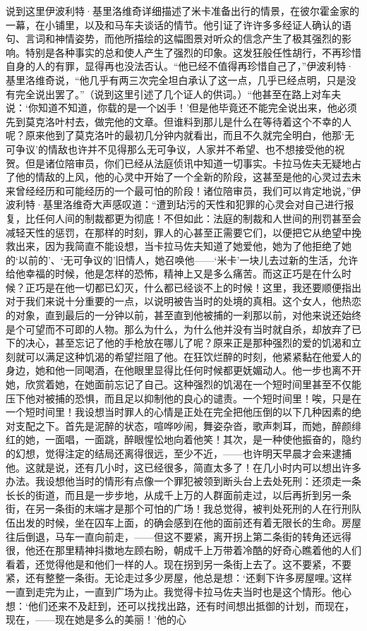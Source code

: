\par 说到这里伊波利特·基里洛维奇详细描述了米卡准备出行的情景，在彼尔霍金家的一幕，在小铺里，以及和马车夫谈话的情节。他引证了许许多多经证人确认的语句、言词和神情姿势，而他所描绘的这幅图景对听众的信念产生了极其强烈的影响。特别是各种事实的总和使人产生了强烈的印象。这发狂般任性胡行，不再珍惜自身的人的有罪，显得再也没法否认。“他已经不值得再珍惜自己了，”伊波利特·基里洛维奇说，“他几乎有两三次完全坦白承认了这一点，几乎已经点明，只是没有完全说出罢了。”（说到这里引述了几个证人的供词。）“他甚至在路上对车夫说：‘你知道不知道，你载的是一个凶手！’但是他毕竟还不能完全说出来，他必须先到莫克洛叶村去，做完他的文章。但谁料到那儿是什么在等待着这个不幸的人呢？原来他到了莫克洛叶的最初几分钟内就看出，而且不久就完全明白，他那‘无可争议’的情敌也许并不见得那么无可争议，人家并不希望、也不想接受他的祝贺。但是诸位陪审员，你们已经从法庭侦讯中知道一切事实。卡拉马佐夫无疑地占了他的情敌的上风，他的心灵中开始了一个全新的阶段，这甚至是他的心灵过去未来曾经经历和可能经历的一个最可怕的阶段！诸位陪审员，我们可以肯定地说，”伊波利特·基里洛维奇大声感叹道：“遭到玷污的天性和犯罪的心灵会对自己进行报复，比任何人间的制裁都更为彻底！不但如此：法庭的制裁和人世间的刑罚甚至会减轻天性的惩罚，在那样的时刻，罪人的心甚至正需要它们，以便把它从绝望中挽救出来，因为我简直不能设想，当卡拉马佐夫知道了她爱他，她为了他拒绝了她的‘以前的’、‘无可争议的’旧情人，她召唤他——‘米卡’一块儿去过新的生活，允许给他幸福的时候，他是怎样的恐怖，精神上又是多么痛苦。而这正巧是在什么时候？正巧是在他一切都已幻灭，什么都已经谈不上的时候！这里，我还要顺便指出对于我们来说十分重要的一点，以说明被告当时的处境的真相。这个女人，他热恋的对象，直到最后的一分钟以前，甚至直到他被捕的一刹那以前，对他来说还始终是个可望而不可即的人物。那么为什么，为什么他并没有当时就自杀，却放弃了已下的决心，甚至忘记了他的手枪放在哪儿了呢？原来正是那种强烈的爱的饥渴和立刻就可以满足这种饥渴的希望拦阻了他。在狂饮烂醉的时刻，他紧紧黏在他爱人的身边，她和他一同喝酒，在他眼里显得比任何时候都更妩媚动人。他一步也离不开她，欣赏着她，在她面前忘记了自己。这种强烈的饥渴在一个短时间里甚至不仅能压下他对被捕的恐惧，而且足以抑制他的良心的谴责。一个短时间里！唉，只是在一个短时间里！我设想当时罪人的心情是正处在完全把他压倒的以下几种因素的绝对支配之下。首先是泥醉的状态，喧哗吵闹，舞姿杂沓，歌声刺耳，而她，醉颜绯红的她，一面唱，一面跳，醉眼惺忪地向着他笑！其次，是一种使他振奋的，隐约的幻想，觉得注定的结局还离得很远，至少不近，——也许明天早晨才会来逮捕他。这就是说，还有几小时，这已经很多，简直太多了！在几小时内可以想出许多办法。我设想他当时的情形有点像一个罪犯被领到断头台上去处死刑：还须走一条长长的街道，而且是一步步地，从成千上万的人群面前走过，以后再折到另一条街，在另一条街的末端才是那个可怕的广场！我总觉得，被判处死刑的人在行刑队伍出发的时候，坐在囚车上面，的确会感到在他的面前还有着无限长的生命。房屋往后倒退，马车一直向前走，——但这不要紧，离开拐上第二条街的转角还远得很，他还在那里精神抖擞地左顾右盼，朝成千上万带着冷酷的好奇心瞧着他的人们看着，还觉得他是和他们一样的人。现在拐到另一条街上去了。这不要紧，不要紧，还有整整一条街。无论走过多少房屋，他总是想：‘还剩下许多房屋哩。’这样一直到走完为止，一直到广场为止。我觉得卡拉马佐夫当时也是这个情形。他心想：‘他们还来不及赶到，还可以找找出路，还有时间想出抵御的计划，而现在，现在，——现在她是多么的美丽！’他的心